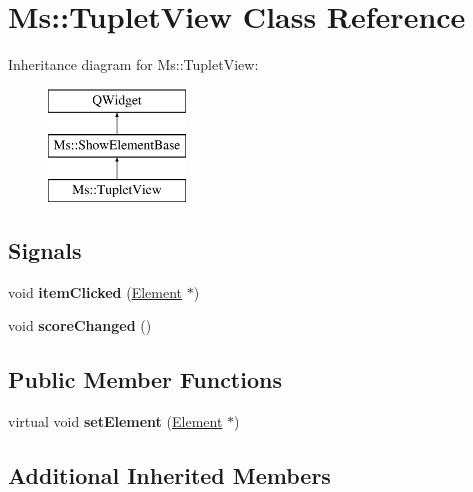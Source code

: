 \hypertarget{class_ms_1_1_tuplet_view}{}\section{Ms\+:\+:Tuplet\+View Class Reference}
\label{class_ms_1_1_tuplet_view}
Inheritance diagram for Ms\+:\+:Tuplet\+View\+:\begin{figure}[H]
\begin{center}
\leavevmode
\includegraphics[height=3.000000cm]{class_ms_1_1_tuplet_view}
\end{center}
\end{figure}
\subsection*{Signals}
\begin{DoxyCompactItemize}
\item 
\mbox{\label{class_ms_1_1_tuplet_view_a97ef02494170f1c9f44f59c1c3de300e}} 
void {\bfseries item\+Clicked} (\hyperlink{class_ms_1_1_element}{Element} $\ast$)
\item 
\mbox{\label{class_ms_1_1_tuplet_view_ad51661590b64f79cb7ab8adc303ae61d}} 
void {\bfseries score\+Changed} ()
\end{DoxyCompactItemize}
\subsection*{Public Member Functions}
\begin{DoxyCompactItemize}
\item 
\mbox{\label{class_ms_1_1_tuplet_view_a7f47abc0e0f8887dbf97b50dc9e0285e}} 
virtual void {\bfseries set\+Element} (\hyperlink{class_ms_1_1_element}{Element} $\ast$)
\end{DoxyCompactItemize}
\subsection*{Additional Inherited Members}


